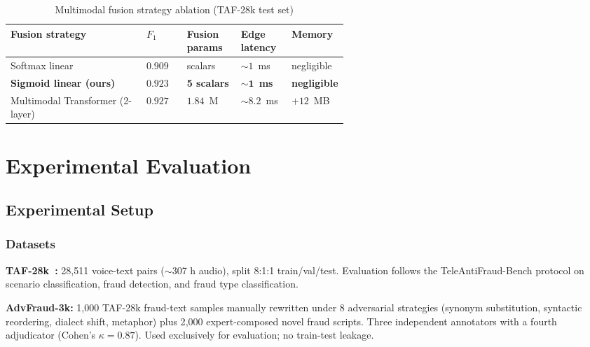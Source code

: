 \documentclass[11pt, a4paper]{article}
\begin{document}
\begin{table}[htbp]
\centering
\caption{Multimodal fusion strategy ablation (TAF-28k test set)}
\label{tab:fusion_ablation-en}
\small
\renewcommand{\arraystretch}{1.2}
\begin{tabular}{l>{\centering\arraybackslash}p{0.12\linewidth}>{\centering\arraybackslash}p{0.16\linewidth}>{\centering\arraybackslash}p{0.15\linewidth}>{\centering\arraybackslash}p{0.13\linewidth}}
\toprule
\textbf{Fusion strategy} & \textbf{$F_1$} & \textbf{Fusion params} & \textbf{Edge latency} & \textbf{Memory} \\
\midrule
Softmax linear & $0.909$ & 5 scalars & $\sim 1$~ms & negligible \\
\rowcolor[gray]{0.93}\textbf{Sigmoid linear (ours)} & $\mathbf{0.923}$ & \textbf{5 scalars} & $\mathbf{\sim 1}$~\textbf{ms} & \textbf{negligible} \\
Multimodal Transformer (2-layer) & $0.927$ & $1.84$~M & $\sim 8.2$~ms & $+12$~MB \\
\bottomrule
\end{tabular}
\end{table}

\section{Experimental Evaluation}

\subsection{Experimental Setup}

\subsubsection{Datasets}

\textbf{TAF-28k~\cite{1}:} 28{,}511 voice-text pairs ($\sim$307 h audio), split 8:1:1 train/val/test. Evaluation follows the TeleAntiFraud-Bench protocol on scenario classification, fraud detection, and fraud type classification.

\textbf{AdvFraud-3k:} 1{,}000 TAF-28k fraud-text samples manually rewritten under 8 adversarial strategies (synonym substitution, syntactic reordering, dialect shift, metaphor) plus 2{,}000 expert-composed novel fraud scripts. Three independent annotators with a fourth adjudicator (Cohen's $\kappa = 0.87$). Used exclusively for evaluation; no train-test leakage.
\end{document}
